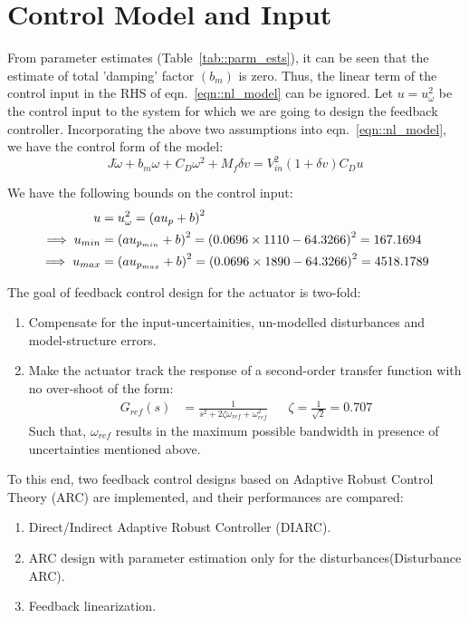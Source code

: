 \section{Control Model and Input}
From parameter estimates (Table~\ref{tab::parm_ests}), it can be seen that the
estimate of total 'damping' factor $( b_m )$ is zero. Thus, the linear term of
the control input in the RHS of eqn.~\ref{eqn::nl_model} can be ignored.
Let $u = u_\omega ^2 $ be the control input to the system for which we are going
to design the feedback controller. Incorporating the above two assumptions into
eqn.~\ref{eqn::nl_model}, we have the control form of the model:
\begin{equation} \label{eqn::control_form}
    J \dot \omega + b_m \omega + C_D \omega^2 + M_f \delta v = V_{in}^2 (1 + \delta v) C_D u
\end{equation}

We have the following bounds on the control input:
\begin{align*}
    u &= u_\omega^2 = \left( a u_p + b \right)^2\\
    \implies u_{min} &= \left( a u_{p_{min}}  + b \right)^2 = \left( 0.0696 \times 1110 - 64.3266 \right)^2 = 167.1694\\
    \implies u_{max} &= \left( a u_{p_{max}}  + b \right)^2 = \left( 0.0696 \times 1890 - 64.3266 \right)^2 = 4518.1789\\
\end{align*}

The goal of feedback control design for the actuator is two-fold:
\begin{enumerate}
\item Compensate for the input-uncertainities, un-modelled disturbances and
model-structure errors.
\item Make the actuator track the response of a second-order transfer function
with no over-shoot of the form:
\begin{align*}
    G_{ref}(s) &= \frac{1}{s^2 + 2 \zeta \omega_{ref} + \omega_{ref}^2}
    && \zeta = \frac{1}{\sqrt{2}} = 0.707
\end{align*}
Such that, $\omega_{ref}$ results in the maximum possible bandwidth in presence
of uncertainties mentioned above.
\end{enumerate}

To this end, two feedback control designs based on Adaptive Robust Control
Theory (ARC) are implemented, and their performances are compared:
\begin{enumerate}
    \item Direct/Indirect Adaptive Robust Controller (DIARC).
    \item ARC design with parameter estimation only for the disturbances(Disturbance ARC).
    \item Feedback linearization.
\end{enumerate}

